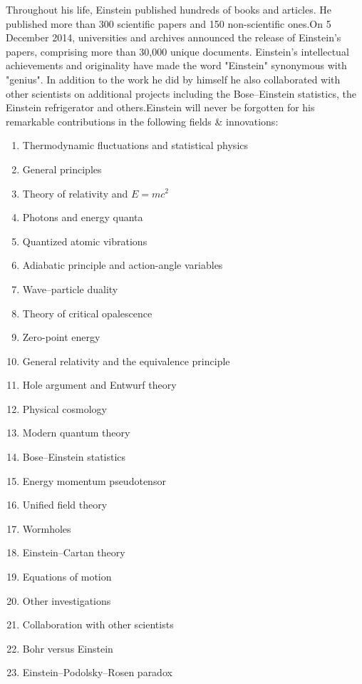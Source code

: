 \documentclass{article}
\begin{document}
Throughout his life, Einstein published hundreds of books and articles. He published more than 300 scientific papers and 150 non-scientific ones.On 5 December 2014, universities and archives announced the release of Einstein's papers, comprising more than 30,000 unique documents. Einstein's intellectual achievements and originality have made the word "Einstein" synonymous with "genius". In addition to the work he did by himself he also collaborated with other scientists on additional projects including the Bose–Einstein statistics, the Einstein refrigerator and others.Einstein will never be forgotten for his remarkable contributions in the following fields \& innovations:

\newpage
\begin{enumerate}
    \item Thermodynamic fluctuations and statistical physics
    \item General principles
    \item Theory of relativity and $ E = mc^2 $
    \item Photons and energy quanta
    \item Quantized atomic vibrations
    \item Adiabatic principle and action-angle variables
    \item Wave–particle duality
    \item Theory of critical opalescence
    \item Zero-point energy
    \item General relativity and the equivalence principle
    \item Hole argument and Entwurf theory
    \item Physical cosmology
    \item Modern quantum theory
    \item Bose–Einstein statistics
    \item Energy momentum pseudotensor
    \item Unified field theory
    \item Wormholes
    \item Einstein–Cartan theory
    \item Equations of motion
    \item Other investigations
    \item Collaboration with other scientists
    \item Bohr versus Einstein
    \item Einstein–Podolsky–Rosen paradox
\end{enumerate}
\end{document}
